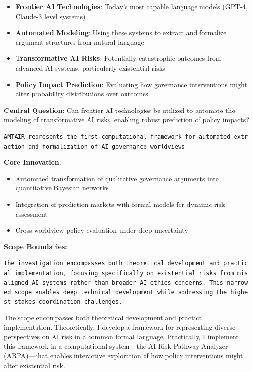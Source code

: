 \documentclass[
  11pt,
  letterpaper,
]{book}
\providecommand{\tightlist}{%
  \setlength{\itemsep}{0pt}\setlength{\parskip}{0pt}}
\begin{document}
\begin{itemize}
\tightlist
\item
  \textbf{Frontier AI Technologies}: Today's most capable language
  models (GPT-4, Claude-3 level systems)
\item
  \textbf{Automated Modeling}: Using these systems to extract and
  formalize argument structures from natural language
\item
  \textbf{Transformative AI Risks}: Potentially catastrophic outcomes
  from advanced AI systems, particularly existential risks
\item
  \textbf{Policy Impact Prediction}: Evaluating how governance
  interventions might alter probability distributions over outcomes
\end{itemize}

\textbf{Central Question}: Can frontier AI technologies be utilized to
automate the modeling of transformative AI risks, enabling robust
prediction of policy impacts?

\texttt{AMTAIR\ represents\ the\ first\ computational\ framework\ for\ automated\ extraction\ and\ formalization\ of\ AI\ governance\ worldviews}

\textbf{Core Innovation}:

\begin{itemize}
\tightlist
\item
  Automated transformation of qualitative governance arguments into
  quantitative Bayesian networks
\item
  Integration of prediction markets with formal models for dynamic risk
  assessment
\item
  Cross-worldview policy evaluation under deep uncertainty
\end{itemize}

\textbf{Scope Boundaries:}

\texttt{The\ investigation\ encompasses\ both\ theoretical\ development\ and\ practical\ implementation,\ focusing\ specifically\ on\ existential\ risks\ from\ misaligned\ AI\ systems\ rather\ than\ broader\ AI\ ethics\ concerns.\ This\ narrowed\ scope\ enables\ deep\ technical\ development\ while\ addressing\ the\ highest-stakes\ coordination\ challenges.}

The scope encompasses both theoretical development and practical
implementation. Theoretically, I develop a framework for representing
diverse perspectives on AI risk in a common formal language.
Practically, I implement this framework in a computational system---the
AI Risk Pathway Analyzer (ARPA)---that enables interactive exploration
of how policy interventions might alter existential risk.
\end{document}
